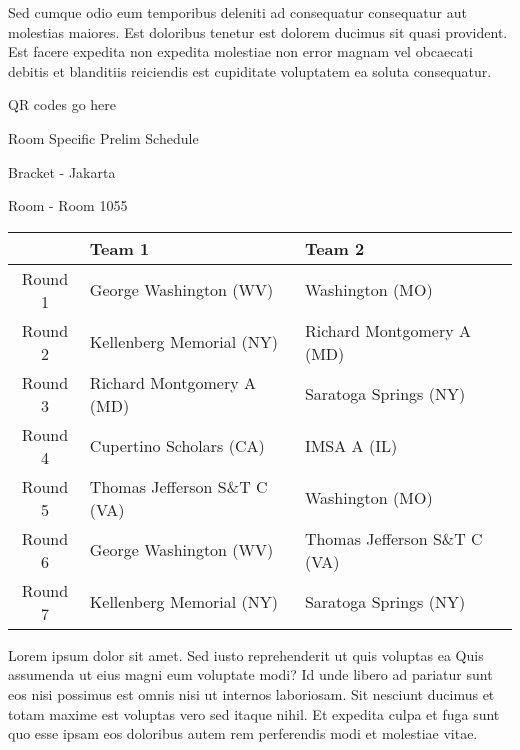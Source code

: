 \documentclass{article}%
\begin{document}
\newline%
Sed cumque odio eum temporibus deleniti ad consequatur consequatur aut molestias maiores. Est doloribus tenetur est dolorem ducimus sit quasi provident. Est facere expedita non expedita molestiae non error magnam vel obcaecati debitis et blanditiis reiciendis est cupiditate voluptatem ea soluta consequatur.%
\vspace*{140pt}%
\begin{center}%
\begin{Huge}%
QR codes go here%
\end{Huge}%
\end{center}%
\newpage%
\begin{center}%
\begin{Huge}%
Room Specific Prelim Schedule%
\end{Huge}%
\vspace*{8pt}%
\linebreak%
\begin{Large}%
Bracket {-} Jakarta%
\end{Large}%
\vspace*{8pt}%
\linebreak%
\vspace*{8pt}%
\begin{Large}%
Room {-} Room 1055%
\end{Large}%
\end{center}%
%
\begin{tabularx}{\textwidth}{|c|Y|Y|}%
\hline%
&Team 1&Team 2\\%
\hline%
Round 1&George Washington (WV)&Washington (MO)\\%
Round 2&Kellenberg Memorial (NY)&Richard Montgomery A (MD)\\%
Round 3&Richard Montgomery A (MD)&Saratoga Springs (NY)\\%
Round 4&Cupertino Scholars (CA)&IMSA A (IL)\\%
Round 5&Thomas Jefferson S\&T C (VA)&Washington (MO)\\%
Round 6&George Washington (WV)&Thomas Jefferson S\&T C (VA)\\%
Round 7&Kellenberg Memorial (NY)&Saratoga Springs (NY)\\%
\hline%
\end{tabularx}%
\vspace*{8pt}%
\newline%
Lorem ipsum dolor sit amet. Sed iusto reprehenderit ut quis voluptas ea Quis assumenda ut eius magni eum voluptate modi? Id unde libero ad pariatur sunt eos nisi possimus est omnis nisi ut internos laboriosam. Sit nesciunt ducimus et totam maxime est voluptas vero sed itaque nihil. Et expedita culpa et fuga sunt quo esse ipsam eos doloribus autem rem perferendis modi et molestiae vitae.\newline%
\end{document}
